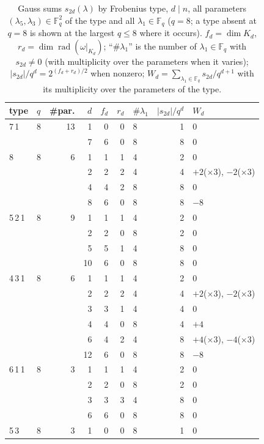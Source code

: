 \documentclass[12pt,a4paper]{amsart}
\theoremstyle{definition}
\newcommand{\F}{\mathbb{F}}
\newcommand{\rad}{\operatorname{rad}}
\begin{document}
\begin{table}[htbp]
\centering\scriptsize\renewcommand{\arraystretch}{0.88}
\caption{Gauss sums $s_{2d}(\lambda)$ by Frobenius type, $d\mid n$, all parameters $(\lambda_5,\lambda_3)\in\F_q^2$ of the type and all $\lambda_1\in\F_q$ ($q=8$; a type absent at $q=8$ is shown at the largest $q\le8$ where it occurs). $f_d=\dim K_d$, $r_d=\dim\rad(\omega|_{K_d})$; ``$\#\lambda_1$'' is the number of $\lambda_1\in\F_q$ with $s_{2d}\ne0$ (with multiplicity over the parameters when it varies); $|s_{2d}|/q^d=2^{(f_d+r_d)/2}$ when nonzero; $W_d=\sum_{\lambda_1\in\F_q}s_{2d}/q^{d+1}$ with its multiplicity over the parameters of the type.}\label{tab:signs}
\begin{tabular}{llrrrrlrl}
\toprule
type & $q$ & \#par. & $d$ & $f_d$ & $r_d$ & $\#\lambda_1$ & $|s_{2d}|/q^d$ & $W_d$\\
\midrule
7\,1 & 8 & 13 & 1 & 0 & 0 & 8 & 1 & $0$\\
 &  &  & 7 & 6 & 0 & 8 & 8 & $0$\\
8 & 8 & 6 & 1 & 1 & 1 & 4 & 2 & $0$\\
 &  &  & 2 & 2 & 2 & 4 & 4 & $+2$($\times$3), $-2$($\times$3)\\
 &  &  & 4 & 4 & 2 & 8 & 8 & $0$\\
 &  &  & 8 & 6 & 0 & 8 & 8 & $-8$\\
5\,2\,1 & 8 & 9 & 1 & 1 & 1 & 4 & 2 & $0$\\
 &  &  & 2 & 2 & 0 & 8 & 2 & $0$\\
 &  &  & 5 & 5 & 1 & 4 & 8 & $0$\\
 &  &  & 10 & 6 & 0 & 8 & 8 & $0$\\
4\,3\,1 & 8 & 6 & 1 & 1 & 1 & 4 & 2 & $0$\\
 &  &  & 2 & 2 & 2 & 4 & 4 & $+2$($\times$3), $-2$($\times$3)\\
 &  &  & 3 & 3 & 1 & 4 & 4 & $0$\\
 &  &  & 4 & 4 & 0 & 8 & 4 & $+4$\\
 &  &  & 6 & 4 & 2 & 4 & 8 & $+4$($\times$3), $-4$($\times$3)\\
 &  &  & 12 & 6 & 0 & 8 & 8 & $-8$\\
6\,1\,1 & 8 & 3 & 1 & 1 & 1 & 4 & 2 & $0$\\
 &  &  & 2 & 2 & 0 & 8 & 2 & $0$\\
 &  &  & 3 & 3 & 3 & 4 & 8 & $0$\\
 &  &  & 6 & 6 & 0 & 8 & 8 & $0$\\
5\,3 & 8 & 3 & 1 & 0 & 0 & 8 & 1 & $0$\\

\end{tabular}
\end{table}
\end{document}
